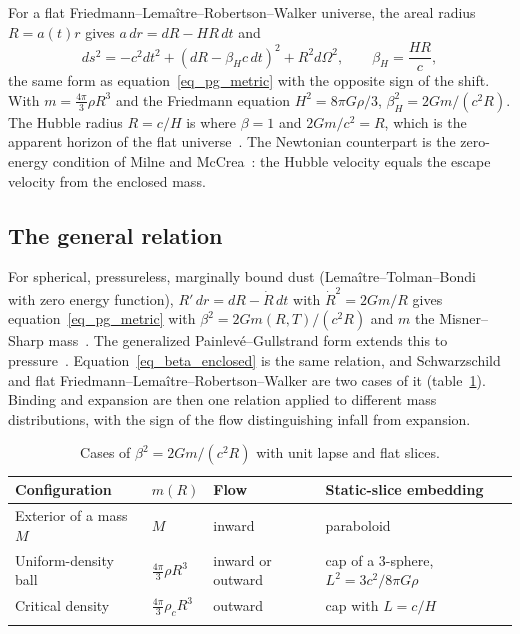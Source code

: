 \documentclass[pdflatex,sn-mathphys-num]{sn-jnl}%
\theoremstyle{thmstyleone}%
\theoremstyle{thmstyletwo}%
\theoremstyle{thmstylethree}%
\begin{document}
For a flat Friedmann--Lema\^itre--Robertson--Walker universe, the areal radius $R=a(t)r$ gives $a\,dr=dR-HR\,dt$ and
\begin{equation}\label{eq_flrw_flow}
    ds^2=-c^2dt^2+\left(dR-\beta_Hc\,dt\right)^2+R^2d\Omega^2,
    \qquad\beta_H=\frac{HR}{c},
\end{equation}
the same form as equation~\eqref{eq_pg_metric} with the opposite sign of the shift. With $m=\tfrac{4\pi}{3}\rho R^3$ and the Friedmann equation $H^2=8\pi G\rho/3$, $\beta_H^2=2Gm/(c^2R)$. The Hubble radius $R=c/H$ is where $\beta=1$ and $2Gm/c^2=R$, which is the apparent horizon of the flat universe~\cite{Faraoni2011,Faraoni2022}. The Newtonian counterpart is the zero-energy condition of Milne and McCrea~\cite{Milne1934,McCreaMilne1934}: the Hubble velocity equals the escape velocity from the enclosed mass.

\subsection{The general relation}

For spherical, pressureless, marginally bound dust (Lema\^itre--Tolman--Bondi~\cite{Lemaitre1933,Tolman1934,Bondi1947} with zero energy function), $R'\,dr=dR-\dot R\,dt$ with $\dot R^2=2Gm/R$ gives equation~\eqref{eq_pg_metric} with $\beta^2=2Gm(R,T)/(c^2R)$ and $m$ the Misner--Sharp mass~\cite{MisnerSharp1964}. The generalized Painlev\'e--Gullstrand form extends this to pressure~\cite{LaskyLun2006}. Equation~\eqref{eq_beta_enclosed} is the same relation, and Schwarzschild and flat Friedmann--Lema\^itre--Robertson--Walker are two cases of it (table~\ref{table_cases}). Binding and expansion are then one relation applied to different mass distributions, with the sign of the flow distinguishing infall from expansion.

\begin{table}[t]
\caption{Cases of $\beta^2=2Gm/(c^2R)$ with unit lapse and flat slices.}\label{table_cases}
\begin{tabular}{@{}llll@{}}
\toprule
Configuration & $m(R)$ & Flow & Static-slice embedding\\
\midrule
Exterior of a mass $M$ & $M$ & inward & paraboloid\\
Uniform-density ball & $\tfrac{4\pi}{3}\rho R^3$ & inward or outward & cap of a 3-sphere, $L^2=3c^2/8\pi G\rho$\\
Critical density & $\tfrac{4\pi}{3}\rho_cR^3$ & outward & cap with $L=c/H$\\
\botrule
\end{tabular}
\end{table}
\end{document}
